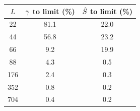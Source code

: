 \begin{tabular}{ccc}
\toprule
$L$ & $\gamma$ to limit (\%) & $\hat S$ to limit (\%) \\
\midrule
22 & 81.1 & 22.0 \\
44 & 56.8 & 23.2 \\
66 & 9.2 & 19.9 \\
88 & 4.3 & 0.5 \\
176 & 2.4 & 0.3 \\
352 & 0.8 & 0.2 \\
704 & 0.4 & 0.2 \\
\bottomrule
\end{tabular}
